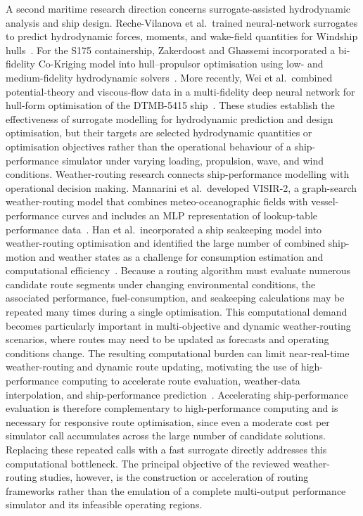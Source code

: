 \documentclass[final,5p,times,twocolumn,numbers]{elsarticle}
\begin{document}
A second maritime research direction concerns surrogate-assisted hydrodynamic analysis and ship design. Reche-Vilanova et al.\ trained neural-network surrogates to predict hydrodynamic forces, moments, and wake-field quantities for Windship hulls~\cite{rechevilanova2024}. For the S175 containership, Zakerdoost and Ghassemi incorporated a bi-fidelity Co-Kriging model into hull--propulsor optimisation using low- and medium-fidelity hydrodynamic solvers~\cite{zakerdoost2023}. More recently, Wei et al.\ combined potential-theory and viscous-flow data in a multi-fidelity deep neural network for hull-form optimisation of the DTMB-5415 ship~\cite{wei2025mfdnn}. These studies establish the effectiveness of surrogate modelling for hydrodynamic prediction and design optimisation, but their targets are selected hydrodynamic quantities or optimisation objectives rather than the operational behaviour of a ship-performance simulator under varying loading, propulsion, wave, and wind conditions.
Weather-routing research connects ship-performance modelling with operational decision making. Mannarini et al.\ developed VISIR-2, a graph-search weather-routing model that combines meteo-oceanographic fields with vessel-performance curves and includes an MLP representation of lookup-table performance data~\cite{mannarini2024visir}. Han et al.\ incorporated a ship seakeeping model into weather-routing optimisation and identified the large number of combined ship-motion and weather states as a challenge for consumption estimation and computational efficiency~\cite{han2025weather}. Because a routing algorithm must evaluate numerous candidate route segments under changing environmental conditions, the associated performance, fuel-consumption, and seakeeping calculations may be repeated many times during a single optimisation. This computational demand becomes particularly important in multi-objective and dynamic weather-routing scenarios, where routes may need to be updated as forecasts and operating conditions change. The resulting computational burden can limit near-real-time weather-routing and dynamic route updating, motivating the use of high-performance computing to accelerate route evaluation, weather-data interpolation, and ship-performance prediction~\cite{abdalsalam2025hpc}. Accelerating ship-performance evaluation is therefore complementary to high-performance computing and is necessary for responsive route optimisation, since even a moderate cost per simulator call accumulates across the large number of candidate solutions. Replacing these repeated calls with a fast surrogate directly addresses this computational bottleneck. The principal objective of the reviewed weather-routing studies, however, is the construction or acceleration of routing frameworks rather than the emulation of a complete multi-output performance simulator and its infeasible operating regions.
\end{document}
